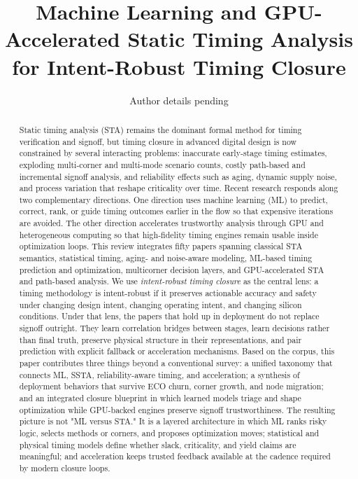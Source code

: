 \documentclass[num-refs]{wiley-article}
\title{Machine Learning and GPU-Accelerated Static Timing Analysis for Intent-Robust Timing Closure}
\author[1]{Author details pending}
\affil[1]{Department, Institution, City, State or Province, Postal Code, Country}
\begin{document}
  \begin{frontmatter}
  \maketitle

  \begin{abstract}
  Static timing analysis (STA) remains the dominant formal method for timing verification and signoff, but timing closure in advanced digital design is now constrained by several interacting problems: inaccurate early-stage timing estimates, exploding multi-corner and multi-mode scenario counts, costly path-based and incremental signoff analysis, and reliability effects such as aging, dynamic supply noise, and process variation that reshape criticality over time. Recent research responds along two complementary directions. One direction uses machine learning (ML) to predict, correct, rank, or guide timing outcomes earlier in the flow so that expensive iterations are avoided. The other direction accelerates trustworthy analysis through GPU and heterogeneous computing so that high-fidelity timing engines remain usable inside optimization loops. This review integrates fifty papers spanning classical STA semantics, statistical timing, aging- and noise-aware modeling, ML-based timing prediction and optimization, multicorner decision layers, and GPU-accelerated STA and path-based analysis. We use \emph{intent-robust timing closure} as the central lens: a timing methodology is intent-robust if it preserves actionable accuracy and safety under changing design intent, changing operating intent, and changing silicon conditions. Under that lens, the papers that hold up in deployment do not replace signoff outright. They learn correlation bridges between stages, learn decisions rather than final truth, preserve physical structure in their representations, and pair prediction with explicit fallback or acceleration mechanisms. Based on the corpus, this paper contributes three things beyond a conventional survey: a unified taxonomy that connects ML, SSTA, reliability-aware timing, and acceleration; a synthesis of deployment behaviors that survive ECO churn, corner growth, and node migration; and an integrated closure blueprint in which learned models triage and shape optimization while GPU-backed engines preserve signoff trustworthiness. The resulting picture is not "ML versus STA." It is a layered architecture in which ML ranks risky logic, selects methods or corners, and proposes optimization moves; statistical and physical timing models define whether slack, criticality, and yield claims are meaningful; and acceleration keeps trusted feedback available at the cadence required by modern closure loops.

  \end{abstract}
  \end{frontmatter}
\end{document}
